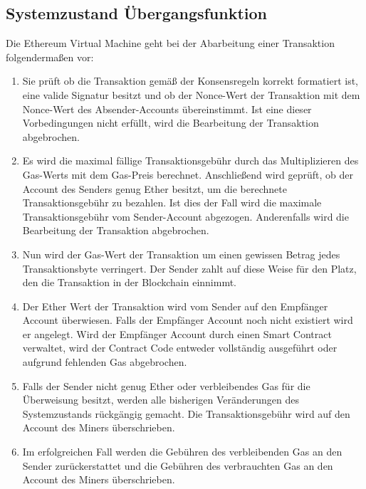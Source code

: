 \subsection{Systemzustand Übergangsfunktion}
Die Ethereum Virtual Machine geht bei der Abarbeitung einer Transaktion folgendermaßen vor:
\begin{enumerate}
\item Sie prüft ob die Transaktion gemäß der Konsensregeln korrekt formatiert ist, eine valide Signatur besitzt und ob der Nonce-Wert der Transaktion mit dem Nonce-Wert des Absender-Accounts übereinstimmt. Ist eine dieser Vorbedingungen nicht erfüllt, wird die Bearbeitung der Transaktion abgebrochen. 
\item Es wird die maximal fällige Transaktionsgebühr durch das Multiplizieren des Gas-Werts mit dem Gas-Preis berechnet. Anschließend wird geprüft, ob der Account des Senders genug Ether besitzt, um die berechnete Transaktionsgebühr zu bezahlen. Ist dies der Fall wird die maximale Transaktionsgebühr vom Sender-Account abgezogen. Anderenfalls wird die Bearbeitung der Transaktion abgebrochen. 
\item Nun wird der Gas-Wert der Transaktion um einen gewissen Betrag jedes Transaktionsbyte verringert. Der Sender zahlt auf diese Weise für den Platz, den die Transaktion in der Blockchain einnimmt.
\item Der Ether Wert der Transaktion wird vom Sender auf den Empfänger Account überwiesen. Falls der Empfänger Account noch nicht existiert wird er angelegt. Wird der Empfänger Account durch einen Smart Contract verwaltet, wird der Contract Code entweder vollständig ausgeführt oder aufgrund fehlenden Gas abgebrochen. 
\item Falls der Sender nicht genug Ether oder verbleibendes Gas für die Überweisung besitzt, werden alle bisherigen Veränderungen des Systemzustands rückgängig gemacht. Die Transaktionsgebühr wird auf den Account des Miners überschrieben.
\item Im erfolgreichen Fall werden die Gebühren des verbleibenden Gas an den Sender zurückerstattet und die Gebühren des verbrauchten Gas an den Account des Miners überschrieben.
\end{enumerate}

